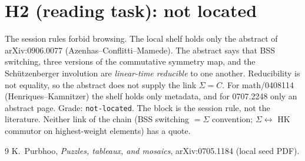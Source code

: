 \documentclass[11pt]{article}
\theoremstyle{definition}
\begin{document}
\section{H2 (reading task): not located}
The session rules forbid browsing. The local shelf holds only the abstract of arXiv:0906.0077 (Azenhas--Conflitti--Mamede).
The abstract says that BSS switching, three versions of the commutative symmetry map, and the Schützenberger involution are
\emph{linear-time reducible} to one another. Reducibility is not equality, so the abstract does not supply the link
$\Sigma=C$. For math/0408114 (Henriques--Kamnitzer) the shelf holds only metadata, and for 0707.2248 only an abstract page.
Grade: \texttt{not-located}. The block is the session rule, not the literature. Neither link of the chain (BSS switching $=\Sigma$
convention; $\Sigma\leftrightarrow$ HK commutor on highest-weight elements) has a quote.

\begin{thebibliography}{9}
 K.~Purbhoo, \emph{Puzzles, tableaux, and mosaics}, arXiv:0705.1184 (local seed PDF).
\end{thebibliography}
\end{document}
